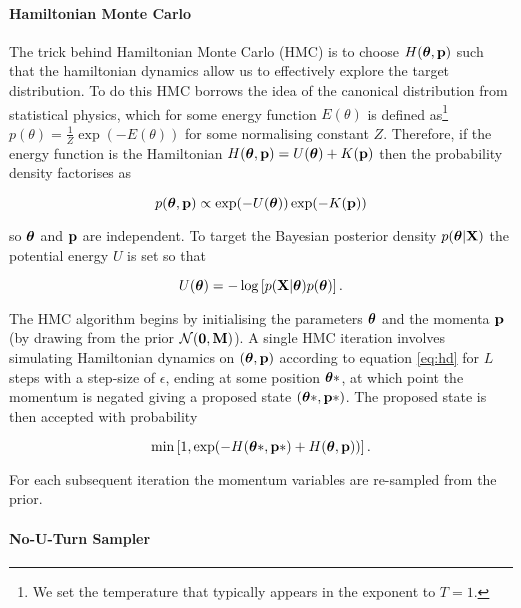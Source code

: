 \paragraph{Hamiltonian Monte Carlo}

The trick behind Hamiltonian Monte Carlo (HMC) is to choose $H(\bm{\theta}, \mathbf{p})$ such that the hamiltonian dynamics allow us to effectively explore the target distribution. To do this HMC borrows the idea of the canonical distribution from statistical physics, which for some energy function $E(\theta)$ is defined as\footnote{We set the temperature that typically appears in the exponent to $T=1$.} $p(\theta) = \frac{1}{Z}\exp(-E(\theta))$ for some normalising constant $Z$. Therefore, if the energy function is the Hamiltonian $H(\bm{\theta}, \mathbf{p}) = U(\bm{\theta}) + K(\mathbf{p})$ then the probability density factorises as

\begin{equation}
	p(\bm{\theta}, \mathbf{p}) \propto \exp(-U(\bm{\theta})) \exp(-K(\mathbf{p}))
\end{equation}

so $\bm{\theta}$ and $\mathbf{p}$ are independent. To target the Bayesian posterior density $p(\bm{\theta} | \mathbf{X})$ the potential energy $U$ is set so that

\begin{equation}
	U(\bm{\theta}) = -\log\left[ p(\mathbf{X} | \bm{\theta}) p(\bm{\theta} )\right].
\end{equation}

The HMC algorithm begins by initialising the parameters $\bm{\theta}$ and the momenta $\mathbf{p}$ (by drawing from the prior $\mathcal{N}(\bm{0}, \mathbf{M})$). A single HMC iteration involves simulating Hamiltonian dynamics on $(\bm{\theta}, \mathbf{p})$ according to equation \ref{eq:hd} for $L$ steps with a step-size of $\epsilon$, ending at some position $\bm{\theta}*$, at which point the momentum is negated giving a proposed state $(\bm{\theta}*, \mathbf{p}*)$. The proposed state is then accepted with probability

\begin{equation}
	\text{min}\left[ 1, \exp(-H(\bm{\theta}*, \mathbf{p}*) + H(\bm{\theta}, \mathbf{p}))\right].
\end{equation}

For each subsequent iteration the momentum variables are re-sampled from the prior.

\paragraph{No-U-Turn Sampler}

